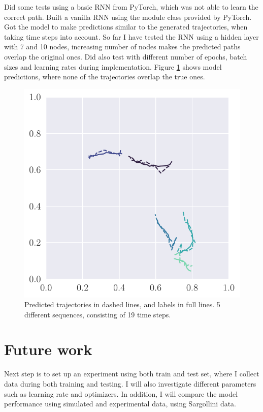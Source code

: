 Did some tests using a basic RNN from PyTorch, which was not able to learn the correct path. Built a vanilla RNN using the module class provided by PyTorch. Got the model to make predictions similar to the generated trajectories, when taking time steps into account. So far I have tested the RNN using a hidden layer with 7 and 10 nodes, increasing number of nodes makes the predicted paths overlap the original ones. Did also test with different number of epochs, batch sizes and learning rates during implementation. Figure \ref{fig:test_model} shows model predictions, where none of the trajectories overlap the true ones.
\begin{figure}[H]
    \centering
    \includegraphics[width=\linewidth]{project/latex/figures/test_model.pdf}
    \caption{Predicted trajectories in dashed lines, and labels in full lines. 5 different sequences, consisting of 19 time steps.}
    \label{fig:test_model}
\end{figure}


\section{Future work}\label{sec:future_work}
Next step is to set up an experiment using both train and test set, where I collect data during both training and testing. I will also investigate different parameters such as learning rate and optimizers. In addition, I will compare the model performance using simulated and experimental data, using Sargollini data.